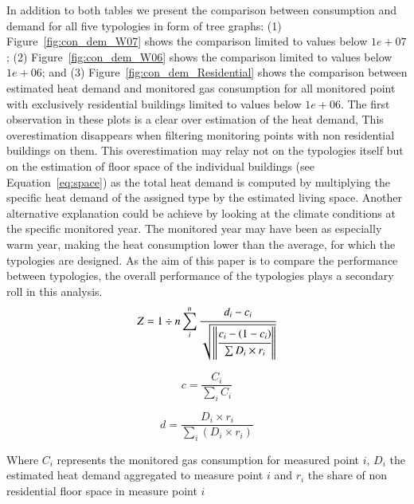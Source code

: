 \documentclass[authoryear,preprint,review,12pt]{elsarticle}
\begin{document}
\begin{linenumbers}
In addition to both tables we present the comparison between consumption and
demand for all five typologies in form of tree graphs: (1)
Figure~\ref{fig:con_dem_W07} shows the comparison limited to values below
$1e+07$; (2) Figure~\ref{fig:con_dem_W06} shows the comparison limited to
values below $1e+06$; and (3) Figure~\ref{fig:con_dem_Residential} shows the
comparison between estimated heat demand and monitored gas consumption for all
monitored point with exclusively residential buildings limited to values below
$1e+06$.  The first observation in these plots is a clear over estimation of
the heat demand, This overestimation disappears when filtering monitoring
points with non residential buildings on them. This overestimation may relay
not on the typologies itself but on the estimation of floor space of the
individual buildings (see Equation~\ref{eq:space}) as the total heat demand is
computed by multiplying the specific heat demand of the assigned type by the
estimated living space. Another alternative explanation could be achieve by
looking at the climate conditions at the specific monitored year. The monitored
year may have been as especially warm year, making the heat consumption lower
than the average, for which the typologies are designed. As the aim of this
paper is to compare the performance between typologies, the overall performance
of the typologies plays a secondary roll in this analysis.\\

\begin{equation}\label{eq:wsz}
  Z =1 \div n\sum_i^n \cfrac{d_i-c_i}{\sqrt{ \left \|
  	  \cfrac{c_i-\left(1-c_i\right)}{\sum{D_i \times r_i}}
  	  \right \|
  	  }}
\end{equation}

\begin{equation} \label{eq:wsz-p}
  c = \frac{C_i}{\sum_i{C_i}}
\end{equation} 

\begin{equation} \label{eq:wsz-E}
  d = \frac{D_{i} \times r_{i}}{\sum_i{\left(D_{i} \times r_{i}\right)
  }}
\end{equation}

Where
$C_i$ represents the monitored gas consumption for measured point $i$,
$D_i$ the estimated heat demand aggregated to measure point $i$ and
$r_i$ the share of non residential floor space in measure point $i$\\





\end{linenumbers}
\end{document}
